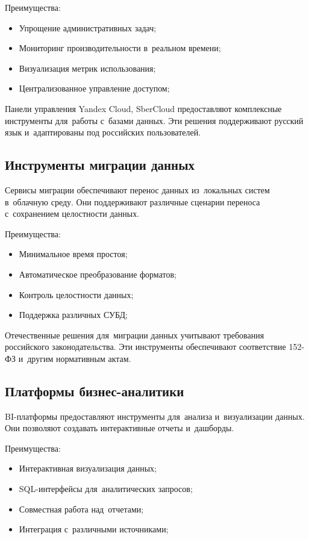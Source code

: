 \documentclass{ou}
\begin{document}
Преимущества:
\begin{itemize}[label=-, itemindent=4em, nosep]
\item Упрощение административных задач;
\item Мониторинг производительности в~реальном времени;
\item Визуализация метрик использования;
\item Централизованное управление доступом;
\end{itemize}

Панели управления Yandex Cloud, SberCloud предоставляют комплексные инструменты для~работы с~базами данных. Эти решения поддерживают русский язык и~адаптированы под российских пользователей.
\subsection{Инструменты миграции данных}
Сервисы миграции обеспечивают перенос данных из~локальных систем в~облачную среду. Они поддерживают различные сценарии переноса с~сохранением целостности данных.

Преимущества:
\begin{itemize}[label=-, itemindent=4em, nosep]
\item Минимальное время простоя;
\item Автоматическое преобразование форматов;
\item Контроль целостности данных;
\item Поддержка различных СУБД;
\end{itemize}

Отечественные решения для~миграции данных учитывают требования российского законодательства. Эти инструменты обеспечивают соответствие 152-ФЗ и~другим нормативным актам.
\subsection{Платформы бизнес-аналитики}
BI-платформы предоставляют инструменты для~анализа и~визуализации данных. Они позволяют создавать интерактивные отчеты и~дашборды.

Преимущества:
\begin{itemize}[label=-, itemindent=4em, nosep]
\item Интерактивная визуализация данных;
\item SQL-интерфейсы для~аналитических запросов;
\item Совместная работа над~отчетами;
\item Интеграция с~различными источниками;
\end{itemize}
\end{document}
